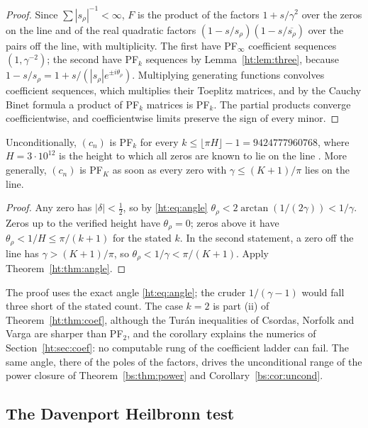 \begin{proof}
Since $\sum|s_\rho|^{-1}<\infty$, $F$ is the product of the factors $1+s/\gamma^2$ over the zeros on the line and of the real quadratic factors $(1-s/s_\rho)(1-s/\overline{s_\rho})$ over the pairs off the line, with multiplicity. The first have PF$_\infty$ coefficient sequences $(1,\gamma^{-2})$; the second have PF$_k$ sequences by Lemma~\ref{ht:lem:three}, because $1-s/s_\rho=1+s/(|s_\rho|e^{\pm i\theta_\rho})$. Multiplying generating functions convolves coefficient sequences, which multiplies their Toeplitz matrices, and by the Cauchy Binet formula a product of PF$_k$ matrices is PF$_k$. The partial products converge coefficientwise, and coefficientwise limits preserve the sign of every minor.
\end{proof}

\begin{corollary}\label{ht:cor:rungs}
Unconditionally, $(c_n)$ is PF$_k$ for every $k\le\lfloor\pi H\rfloor-1=9424777960768$, where $H=3\cdot10^{12}$ is the height to which all zeros are known to lie on the line \cite{PT21}. More generally, $(c_n)$ is PF$_K$ as soon as every zero with $\gamma\le(K+1)/\pi$ lies on the line.
\end{corollary}

\begin{proof}
Any zero has $|\delta|<\frac12$, so by \eqref{ht:eq:angle} $\theta_\rho<2\arctan(1/(2\gamma))<1/\gamma$. Zeros up to the verified height have $\theta_\rho=0$; zeros above it have $\theta_\rho<1/H\le\pi/(k+1)$ for the stated $k$. In the second statement, a zero off the line has $\gamma>(K+1)/\pi$, so $\theta_\rho<1/\gamma<\pi/(K+1)$. Apply Theorem~\ref{ht:thm:angle}.
\end{proof}

The proof uses the exact angle \eqref{ht:eq:angle}; the cruder $1/(\gamma-1)$ would fall three short of the stated count. The case $k=2$ is part (ii) of Theorem~\ref{ht:thm:coef}, although the Tur\'an inequalities of Csordas, Norfolk and Varga are sharper than PF$_2$, and the corollary explains the numerics of Section~\ref{ht:sec:coef}: no computable rung of the coefficient ladder can fail. The same angle, there of the poles of the factors, drives the unconditional range of the power closure of Theorem~\ref{bs:thm:power} and Corollary~\ref{bs:cor:uncond}.

\subsection{The Davenport Heilbronn test}\label{ht:sec:dhtest}\label{ht:sec:dh}

